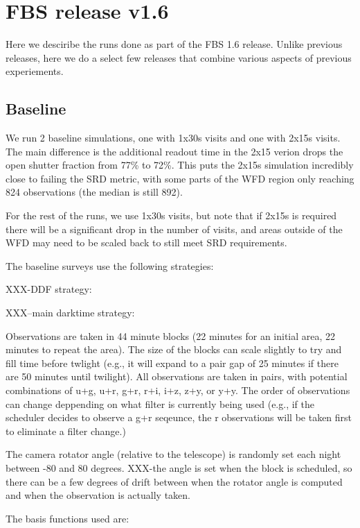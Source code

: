 
\section{FBS release v1.6}

Here we desciribe the runs done as part of the FBS 1.6 release.  Unlike previous releases, here we do a select few releases that combine various aspects of previous experiements.


\subsection{Baseline}


We run 2 baseline simulations, one with 1x30s visits and one with 2x15s visits.  The main difference is the additional readout time in the 2x15 verion drops the open shutter fraction from 77\% to 72\%. This puts the 2x15s simulation incredibly close to failing the SRD metric, with some parts of the WFD region only reaching 824 observations (the median is still 892). 

For the rest of the runs, we use 1x30s visits, but note that if 2x15s is required there will be a significant drop in the number of visits, and areas outside of the WFD may need to be scaled back to still meet SRD requirements.

The baseline surveys use the following strategies:

XXX-DDF strategy:


XXX--main darktime strategy: 

Observations are taken in 44 minute blocks (22 minutes for an initial area, 22 minutes to repeat the area). The size of the blocks can scale slightly to try and fill time before twlight (e.g., it will expand to a pair gap of 25 minutes if there are 50 minutes until twilight). All observations are taken in pairs, with potential combinations of u+g, u+r, g+r, r+i, i+z, z+y, or y+y. The order of observations can change deppending on what filter is currently being used (e.g., if the scheduler decides to observe a g+r seqeunce, the r observations will be taken first to eliminate a filter change.)

The camera rotator angle (relative to the telescope) is randomly set each night between -80 and 80 degrees.  XXX-the angle is set when the block is scheduled, so there can be a few degrees of drift between when the rotator angle is computed and when the observation is actually taken.

The basis functions used are:

